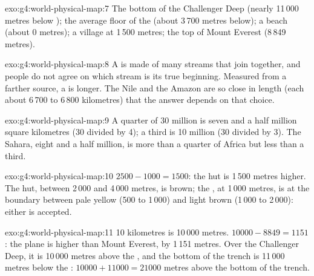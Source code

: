 \begin{solution}{exo:g4:world-physical-map:7}
The bottom of the Challenger Deep (nearly 11\,000 metres below );
the average floor of the  (about 3\,700 metres below); a beach (about
0 metres); a village at 1\,500 metres; the top of Mount Everest
(8\,849 metres).
\end{solution}

\begin{solution}{exo:g4:world-physical-map:8}
A  is made of many streams that join together, and people do not agree
on which stream is its true beginning. Measured from a farther source, a
 is longer. The Nile and the Amazon are so close in length (each about
6\,700 to 6\,800 kilometres) that the answer depends on that choice.
\end{solution}

\begin{solution}{exo:g4:world-physical-map:9}
A quarter of 30 million is seven and a half million square kilometres (30
divided by 4); a third is 10 million (30 divided by 3). The Sahara, eight
and a half million, is more than a quarter of Africa but less than a
third.
\end{solution}

\begin{solution}{exo:g4:world-physical-map:10}
$2500 - 1000 = 1500$: the hut is 1\,500 metres higher. The hut, between
2\,000 and 4\,000 metres, is brown; the , at 1\,000 metres, is at the
boundary between pale yellow (500 to 1\,000) and light brown (1\,000 to
2\,000): either is accepted.
\end{solution}

\begin{solution}{exo:g4:world-physical-map:11}
10 kilometres is 10\,000 metres. $10000 - 8849 = 1151$: the plane is higher
than Mount Everest, by 1\,151 metres. Over the Challenger Deep, it is
10\,000 metres above the , and the bottom of the trench is 11\,000
metres below the : $10000 + 11000 = 21000$ metres above the bottom of
the trench.
\end{solution}
